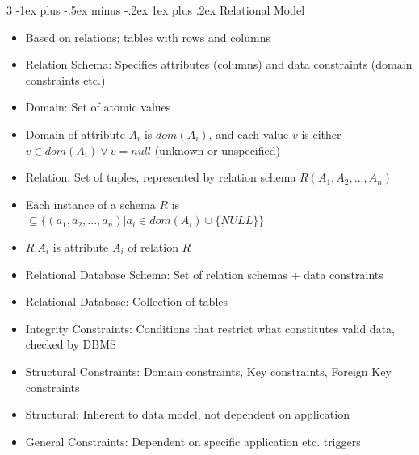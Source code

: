 \documentclass[10pt, landscape]{article}
\makeatletter
\renewcommand{\subsection}{\@startsection{subsection}{3}{0mm}%
                                {-1ex plus -.5ex minus -.2ex}%
                                {1ex plus .2ex}%
                                {\normalfont\small\bfseries}}%
\makeatother
\begin{document}
\begin{multicols*}{3}
\subsection{Relational Model}
\begin{itemize}
    \item Based on relations; tables with rows and columns
    \item Relation Schema: Specifies attributes (columns) and data constraints (domain constraints etc.)
    \item Domain: Set of atomic values
    \item Domain of attribute $A_i$ is $dom(A_i)$, and each value $v$ is either $v \in dom(A_i) \lor v = null$ (unknown or unspecified)
    \item Relation: Set of tuples, represented by relation schema $R(A_1,A_2,...,A_n)$
    \item Each instance of a schema $R$ is $\subseteq \{(a_1,a_2,...,a_n)|a_i \in dom(A_i)\cup \{NULL\}\}$
    \item $R.A_i$ is attribute $A_i$ of relation $R$
    \item Relational Database Schema: Set of relation schemas + data constraints
    \item Relational Database: Collection of tables
    \item Integrity Constraints: Conditions that restrict what constitutes valid data, checked by DBMS
    \item Structural Constraints: Domain constraints, Key constraints, Foreign Key constraints
    \item Structural: Inherent to data model, not dependent on application
    \item General Constraints: Dependent on specific application etc. triggers
\end{itemize}


\end{multicols*}
\end{document}
